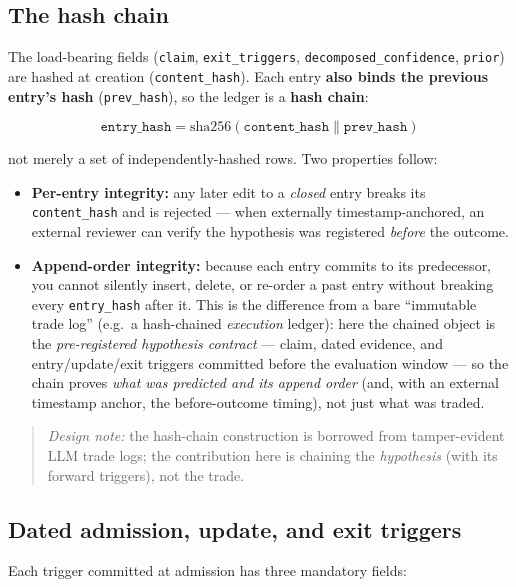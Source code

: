 \documentclass[11pt]{article}
\begin{document}
\subsection*{The hash chain}

The load-bearing fields (\texttt{claim}, \texttt{exit\_triggers},
\texttt{decomposed\_confidence}, \texttt{prior}) are hashed at creation (\texttt{content\_hash}).
Each entry \textbf{also binds the previous entry's hash} (\texttt{prev\_hash}), so the ledger is a
\textbf{hash chain}:

\[
  \texttt{entry\_hash} = \mathrm{sha256}(\texttt{content\_hash} \mathbin{\|} \texttt{prev\_hash})
\]

not merely a set of independently-hashed rows. Two properties follow:

\begin{itemize}
  \item \textbf{Per-entry integrity:} any later edit to a \emph{closed} entry breaks its
    \texttt{content\_hash} and is rejected --- when externally timestamp-anchored, an external
    reviewer can verify the hypothesis was registered \emph{before} the outcome.
  \item \textbf{Append-order integrity:} because each entry commits to its predecessor, you cannot
    silently insert, delete, or re-order a past entry without breaking every \texttt{entry\_hash}
    after it. This is the difference from a bare ``immutable trade log'' (e.g.\ a hash-chained
    \emph{execution} ledger): here the chained object is the \emph{pre-registered hypothesis
    contract} --- claim, dated evidence, and entry/update/exit triggers committed before the
    evaluation window --- so the chain proves \emph{what was predicted and its append order} (and,
    with an external timestamp anchor, the before-outcome timing), not just what
    was traded.
\end{itemize}

\begin{quote}
  \textit{Design note:} the hash-chain construction is borrowed from tamper-evident LLM trade logs;
  the contribution here is chaining the \emph{hypothesis} (with its forward triggers), not the trade.
\end{quote}

\subsection*{Dated admission, update, and exit triggers}

Each trigger committed at admission has three mandatory fields:
\end{document}

